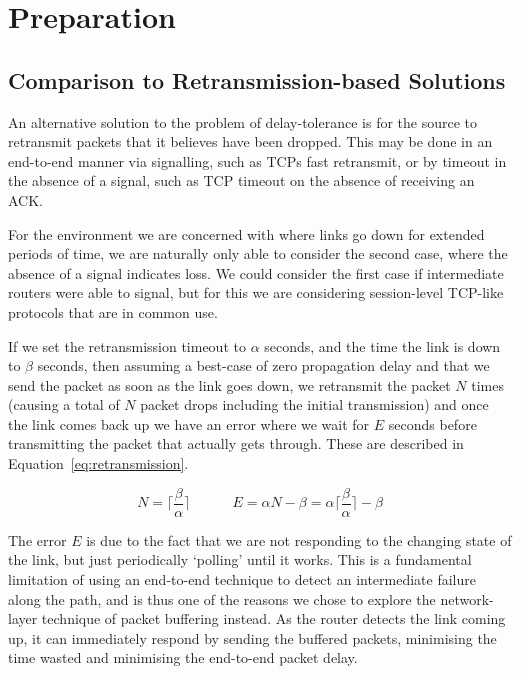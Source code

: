\documentclass[withindex,glossary,openany]{cam-thesis}
\begin{document}
\chapter{Preparation}

\section{Comparison to Retransmission-based Solutions}
\label{sec:retransmission}

An alternative solution to the problem of delay-tolerance  is for the source to retransmit packets that it believes have been dropped. This may be done in an end-to-end manner via signalling, such as TCPs fast retransmit, or by timeout in the absence of a signal, such as TCP timeout on the absence of receiving an ACK.

For the environment we are concerned with where links go down for extended periods of time, we are naturally only able to consider the second case, where the absence of a signal indicates loss. We could consider the first case if intermediate routers were able to signal, but for this we are considering session-level TCP-like protocols that are in common use.

If we set the retransmission timeout to $\alpha$ seconds, and the time the link is down to $\beta$ seconds, then assuming a best-case of zero propagation delay and that we send the packet as soon as the link goes down, we retransmit the packet $N$ times (causing a total of $N$ packet drops including the initial transmission) and once the link comes back up we have an error where we wait for $E$ seconds before transmitting the packet that actually gets through. These are described in Equation~\ref{eq:retransmission}.

\begin{equation} \label{eq:retransmission}
N = \Big\lceil\frac{\beta}{\alpha}\Big\rceil 
\quad\quad\quad
E = \alpha N - \beta = \alpha \Big\lceil\frac{\beta}{\alpha}\Big\rceil - \beta
\end{equation}

The error $E$ is due to the fact that we are not responding to the changing state of the link, but just periodically `polling' until it works. This is a fundamental limitation of using an end-to-end technique to detect an intermediate failure along the path, and is thus one of the reasons we chose to explore the network-layer technique of packet buffering instead. As the router detects the link coming up, it can immediately respond by sending the buffered packets, minimising the time wasted and minimising the end-to-end packet delay.
\end{document}
